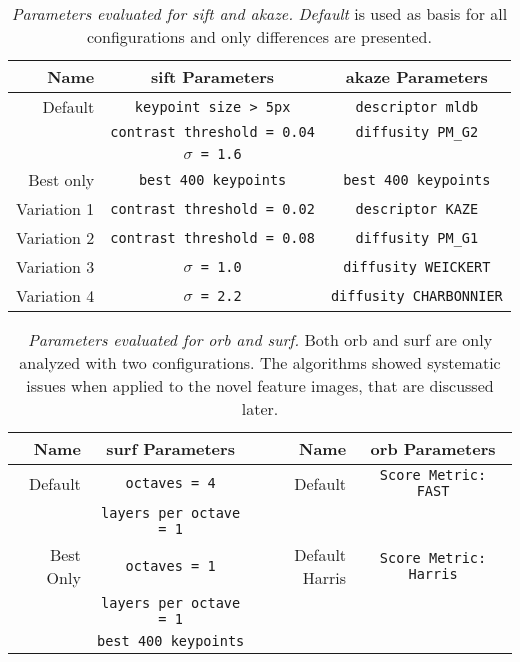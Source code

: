\begin{table}[H]
    {\renewcommand{\arraystretch}{1.2}%
    \setlength{\tabcolsep}{0.5em}%
    \footnotesize
    \begin{tabular}{rcc}
    \toprule
    \textbf{Name}   & \textbf{\acrshort{sift} Parameters} & \textbf{\acrshort{akaze} Parameters} \\
    \midrule
        Default     & \texttt{keypoint size > 5px}        & \texttt{descriptor \acrshort{mldb}} \\
        \null       & \texttt{contrast threshold = 0.04}  & \texttt{diffusity PM\_G2} \\
        \null       & \texttt{$\sigma$ = 1.6}             & \null \\
        Best only   & \texttt{best 400 keypoints}         & \texttt{best 400 keypoints} \\
        Variation 1 & \texttt{contrast threshold = 0.02}  & \texttt{descriptor KAZE} \\
        Variation 2 & \texttt{contrast threshold = 0.08}  & \texttt{diffusity PM\_G1} \\
        Variation 3 & \texttt{$\sigma$ = 1.0}             & \texttt{diffusity WEICKERT} \\
        Variation 4 & \texttt{$\sigma$ = 2.2}             & \texttt{diffusity CHARBONNIER} \\
    \bottomrule
    \end{tabular}
    }
    \caption[Parameters evaluated for \acrshort{sift} and \acrshort{akaze}]{\emph{Parameters evaluated for \acrshort{sift} and \acrshort{akaze}.} \emph{Default} is used as basis for all configurations and only differences are presented.}
\end{table}
\begin{table}[H]
    {\renewcommand{\arraystretch}{1.2}%
    \setlength{\tabcolsep}{0.5em}%
    \footnotesize
    \begin{tabular}{rcrc}
    \toprule
    \textbf{Name} & \textbf{\acrshort{surf} Parameters} & \textbf{Name}  & \textbf{\acrshort{orb} Parameters} \\
    \midrule
        Default   & \texttt{octaves = 4}                & Default        & \texttt{Score Metric: FAST} \\
        \null     & \texttt{layers per octave = 1}      & \null          & \null \\
        Best Only & \texttt{octaves = 1}                & Default Harris & \texttt{Score Metric: Harris} \\
        \null     & \texttt{layers per octave = 1}      & \null          & \null \\
        \null     & \texttt{best 400 keypoints}         & \null          & \null \\
    \bottomrule
    \end{tabular}
    }
    \caption[Parameters evaluated for \acrshort{orb} and \acrshort{surf}]{\emph{Parameters evaluated for \acrshort{orb} and \acrshort{surf}.} Both \acrshort{orb} and \acrshort{surf} are only analyzed with two configurations. The algorithms showed systematic issues when applied to the novel feature images, that are discussed later.}
\end{table}
